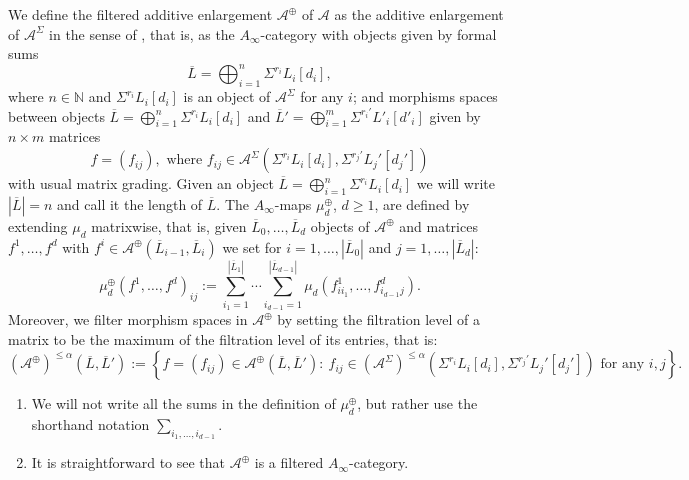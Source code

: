 \begin{dfn}
	We define the filtered additive enlargement $\mathcal{A}^\oplus$ of $\mathcal{A}$ as the additive enlargement of $\mathcal{A}^\Sigma$ in the sense of \cite[Section (3k)]{Se:book-fukaya-categ}, that is, as the $A_\infty$-category with objects given by formal sums $$\overline{L} = \bigoplus_{i=1}^n\Sigma^{r_i}L_i[d_i],$$ where $n\in \mathbb N$ and $\Sigma^{r_i}L_i[d_i]$ is an object of $\mathcal{A}^\Sigma$ for any $i$; and morphisms spaces between objects $\overline{L}=\bigoplus_{i=1}^n\Sigma^{r_i}L_i[d_i]$ and $\overline{L}'=\bigoplus_{i=1}^m\Sigma^{r_i'}L'_i[d'_i]$ given by $n\times m$ matrices $$f = (f_{ij}), \text{  where } f_{ij}\in \mathcal{A}^\Sigma\left(\Sigma^{r_i}L_i[d_i],\Sigma^{r_j'}L_j'[d_j']\right)$$ with usual matrix grading. Given an object $\overline{L}=\bigoplus_{i=1}^n\Sigma^{r_i}L_i[d_i]$ we will write $|\overline{L}|=n$ and call it the length of $\overline{L}$. The $A_\infty$-maps $\mu_d^\oplus$, $d\geq 1$, are defined by extending $\mu_d$ matrixwise, that is, given $\overline{L}_0,\ldots, \overline{L}_d$ objects of $\mathcal{A}^\oplus$ and matrices $f^1,\ldots,f^d$ with $f^i\in \mathcal{A}^\oplus(\overline{L}_{i-1},\overline{L}_i)$ we set for $i=1,\ldots, |\overline{L}_0|$ and $j=1,\ldots, |\overline{L}_d|$: $$\mu_d^\oplus\left(f^1,\ldots, f^d\right)_{ij}:= \sum_{i_1=1}^{|\overline{L}_1|}\cdots \sum_{i_{d-1}=1}^{|\overline{L}_{d-1}|}\mu_d\left(f^1_{ii_1},\ldots, f^d_{i_{d-1}j}\right).$$
	Moreover, we filter morphism spaces in $\mathcal{A}^\oplus$ by setting the filtration level of a matrix to be the maximum of the filtration level of its entries, that is: $$(\mathcal{A}^\oplus)^{\leq \alpha}(\overline{L},\overline{L}') := \left\{f= (f_{ij})\in \mathcal{A}^\oplus(\overline{L},\overline{L}'):\ f_{ij}\in (\mathcal{A}^\Sigma)^{\leq \alpha}\left(\Sigma^{r_i}L_i[d_i], \Sigma^{r_j'}L_j'[d_j']\right )\text{  for any }i,j\right\}.$$
\end{dfn} 

\begin{rem}
	\begin{enumerate}
		\item We will not write all the sums in the definition of $\mu_d^\oplus$, but rather use the shorthand notation $\sum_{i_1,\ldots, i_{d-1}}$.
		\item It is straightforward to see that $\mathcal{A}^\oplus$ is a filtered $A_\infty$-category.
	\end{enumerate}
\end{rem}

